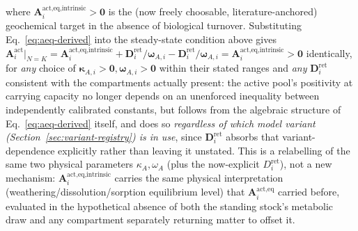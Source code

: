 \documentclass[twocolumn,10pt]{article}
\begin{document}
where $\mathbf A^{\text{act},\text{eq,intrinsic}}_i>\mathbf 0$ is the (now freely choosable, literature-anchored) geochemical target in the absence of biological turnover. Substituting Eq.~\eqref{eq:aeq-derived} into the steady-state condition above gives $\mathbf A^{\text{act}}_i\big|_{N=K}=\mathbf A^{\text{act},\text{eq,intrinsic}}_i+\mathbf D^{\text{ret}}_i/\boldsymbol\omega_{A,i}-\mathbf D^{\text{ret}}_i/\boldsymbol\omega_{A,i}=\mathbf A^{\text{act},\text{eq,intrinsic}}_i>\mathbf 0$ identically, for \emph{any} choice of $\boldsymbol\kappa_{A,i}>\mathbf 0,\boldsymbol\omega_{A,i}>\mathbf 0$ within their stated ranges and \emph{any} $\mathbf D^{\text{ret}}_i$ consistent with the compartments actually present: the active pool's positivity at carrying capacity no longer depends on an unenforced inequality between independently calibrated constants, but follows from the algebraic structure of Eq.~\eqref{eq:aeq-derived} itself, and does so \emph{regardless of which model variant (Section~\ref{sec:variant-registry}) is in use}, since $\mathbf D^{\text{ret}}_i$ absorbs that variant-dependence explicitly rather than leaving it unstated. This is a relabelling of the same two physical parameters $\kappa_A,\omega_A$ (plus the now-explicit $D^{\text{ret}}_i$), not a new mechanism: $\mathbf A^{\text{act},\text{eq,intrinsic}}_i$ carries the same physical interpretation (weathering/dissolution/sorption equilibrium level) that $\mathbf A^{\text{act},\text{eq}}_i$ carried before, evaluated in the hypothetical absence of both the standing stock's metabolic draw and any compartment separately returning matter to offset it.
\end{document}
